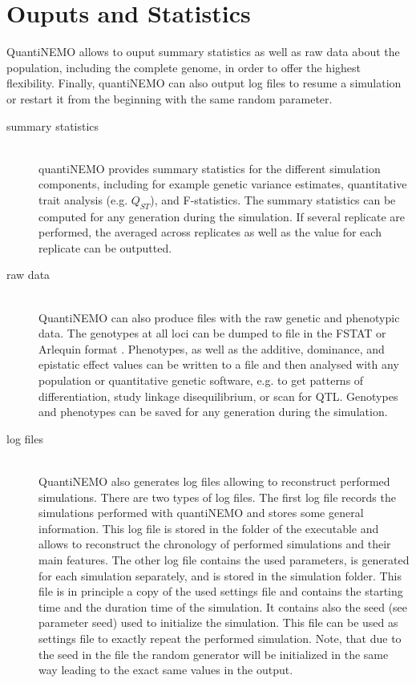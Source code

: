 \documentclass[letterpaper,12pt,oneside]{book}
\begin{document}
\chapter{Ouputs and Statistics}
\label{chap:OutputsAndStatistics}
QuantiNEMO allows to ouput summary statistics as well as raw data about the population, including the complete genome, in order to offer the highest flexibility. Finally, quantiNEMO can also output log files to resume a simulation or restart it from the beginning with the same random parameter. 
\begin{description}
\item[summary statistics]\hspace*{\fill}\\
quantiNEMO provides summary statistics for the different simulation components, including for example genetic variance estimates, quantitative trait analysis (e.g. $Q_{ST}$), and F-statistics. The summary statistics can be computed for any generation during the simulation. If several replicate are performed, the averaged across replicates as well as the value for each replicate can be outputted. 

\item[raw data]\hspace*{\fill}\\
QuantiNEMO can also produce files with the raw genetic and phenotypic data. The genotypes at all loci can be dumped to file in the FSTAT  \citep{Goudet_1995} or Arlequin format \citep{Excoffier_2010}. Phenotypes, as well as the additive, dominance, and epistatic effect values can be written to a file and then analysed with any population or quantitative genetic software, e.g. to get patterns of differentiation, study linkage disequilibrium, or scan for QTL. Genotypes and phenotypes can be saved for any generation during the simulation.

\item[log files]\hspace*{\fill}\\
QuantiNEMO also generates log files allowing to reconstruct performed simulations. There are two types of log files. The first log file records the simulations performed with quantiNEMO and stores some general information. This log file is stored in the folder of the executable and allows to reconstruct the chronology of performed simulations and their main features. The other log file contains the used parameters, is generated for each simulation separately, and is stored in the simulation folder. This file is in principle a copy of the used settings file and contains the starting time and the duration time of the simulation. It contains also the seed (see parameter \textsf{seed}) used to initialize the simulation. This file can be used as settings file to exactly repeat the performed simulation. Note, that due to the seed in the file the random generator will be initialized in the same way leading to the exact same values in the output.
\end{description}
\end{document}
